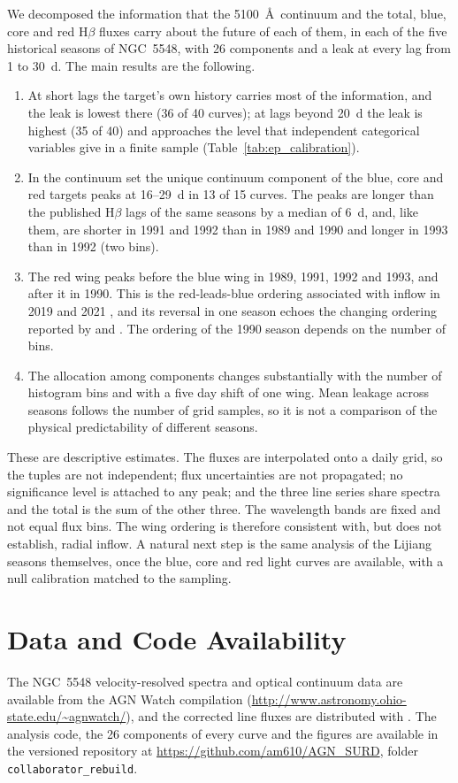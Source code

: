 \documentclass[fleqn,usenatbib]{mnras}
\begin{document}
We decomposed the information that the 5100~\AA\ continuum and the total, blue, core and red H$\beta$ fluxes carry about the future of each of them, in each of the five historical seasons of NGC~5548, with 26 components and a leak at every lag from 1 to 30~d. The main results are the following.
\begin{enumerate}
\item At short lags the target's own history carries most of the information, and the leak is lowest there (36 of 40 curves); at lags beyond 20~d the leak is highest (35 of 40) and approaches the level that independent categorical variables give in a finite sample (Table~\ref{tab:ep_calibration}).
\item In the continuum set the unique continuum component of the blue, core and red targets peaks at 16--29~d in 13 of 15 curves. The peaks are longer than the published H$\beta$ lags of the same seasons by a median of 6~d, and, like them, are shorter in 1991 and 1992 than in 1989 and 1990 and longer in 1993 than in 1992 (two bins).
\item The red wing peaks before the blue wing in 1989, 1991, 1992 and 1993, and after it in 1990. This is the red-leads-blue ordering associated with inflow in 2019 and 2021 \citep{Xi2025}, and its reversal in one season echoes the changing ordering reported by \citet{Lu2022} and \citet{Xi2025}. The ordering of the 1990 season depends on the number of bins.
\item The allocation among components changes substantially with the number of histogram bins and with a five day shift of one wing. Mean leakage across seasons follows the number of grid samples, so it is not a comparison of the physical predictability of different seasons.
\end{enumerate}
These are descriptive estimates. The fluxes are interpolated onto a daily grid, so the tuples are not independent; flux uncertainties are not propagated; no significance level is attached to any peak; and the three line series share spectra and the total is the sum of the other three. The wavelength bands are fixed and not equal flux bins. The wing ordering is therefore consistent with, but does not establish, radial inflow. A natural next step is the same analysis of the Lijiang seasons themselves, once the blue, core and red light curves are available, with a null calibration matched to the sampling.

\section*{Data and Code Availability}
The NGC~5548 velocity-resolved spectra and optical continuum data are available from the AGN Watch compilation (\url{http://www.astronomy.ohio-state.edu/~agnwatch/}), and the corrected line fluxes are distributed with \citet{WandersPeterson1996}. The analysis code, the 26 components of every curve and the figures are available in the versioned repository at \url{https://github.com/am610/AGN_SURD}, folder \texttt{collaborator\_rebuild}.



\end{document}
